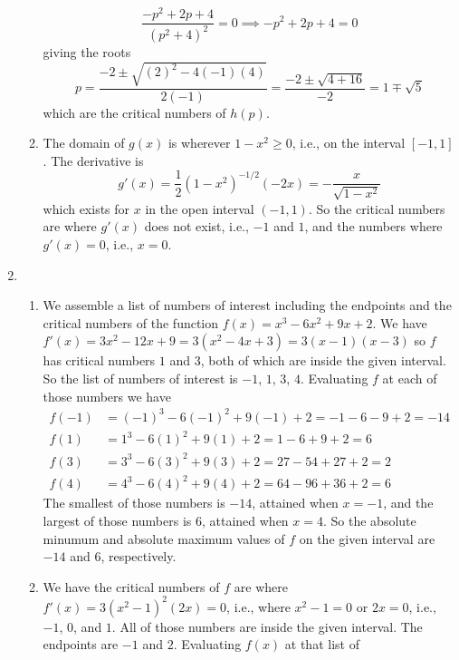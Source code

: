 \documentclass{article}
\begin{document}
\begin{enumerate}
\begin{enumerate}
\begin{equation*}
      \frac{-p^2+2p+4}{(p^2+4)^2} = 0
      \implies
      -p^2+2p+4 = 0
    \end{equation*}
    giving the roots
    \begin{equation*}
      p = \frac{-2\pm \sqrt{(2)^2-4(-1)(4)}}{2(-1)}
      = \frac{-2\pm \sqrt{4+16}}{-2}
      = 1 \mp \sqrt{5}
    \end{equation*}
    which are the critical numbers of $h(p)$.
  \item The domain of $g(x)$ is wherever $1-x^2 \ge 0$, i.e.,
    on the interval $[-1,1]$.  The derivative is
    \begin{equation*}
      g'(x) = \frac{1}{2} (1-x^2)^{-1/2} (-2x) = -\frac{x}{\sqrt{1-x^2}}
    \end{equation*}
    which exists for $x$ in the open interval $(-1,1)$.
    So the critical numbers are where $g'(x)$ does not exist, i.e., $-1$ and
    $1$, and the numbers where $g'(x)=0$, i.e., $x=0$.
  \end{enumerate}
\item %
  \begin{enumerate}
  \item We assemble a list of numbers of interest including the endpoints and
    the critical numbers of the function $f(x)=x^3-6x^2+9x+2$.  We have
    $f'(x)=3x^2-12x+9=3(x^2-4x+3)=3(x-1)(x-3)$ so $f$ has critical numbers
    $1$ and $3$, both of which are inside the given interval.  So the list
    of numbers of interest is $-1$, $1$, $3$, $4$.  Evaluating $f$ at each of
    those numbers we have
    \begin{align*}
      f(-1)&=(-1)^3-6(-1)^2+9(-1)+2
      = -1 -6 -9 + 2=-14 
      \\
      f(1) &= 1^3-6(1)^2+9(1)+2
      = 1 -6 +9 + 2=6
      \\
      f(3) &= 3^3-6(3)^2+9(3)+2
      = 27-54+27+2
      = 2
      \\
      f(4) &= 4^3 -6(4)^2+9(4) +2
      = 64-96+36+2
      = 6
    \end{align*}
    The smallest of those numbers is $-14$, attained when $x=-1$, and the
    largest of those numbers is $6$, attained when $x=4$. So the absolute
    minumum and absolute maximum values of $f$ on the given interval are $-14$
    and $6$, respectively.
  \item We have the critical numbers of $f$ are where
    $f'(x)=3(x^2-1)^2(2x)=0$, i.e., where $x^2-1=0$ or $2x=0$, i.e., $-1$, 
    $0$, and $1$.  All of those numbers are inside the given interval.
    The endpoints are $-1$ and $2$.  Evaluating $f(x)$ at that list of

\end{enumerate}
\end{enumerate}
\end{document}
